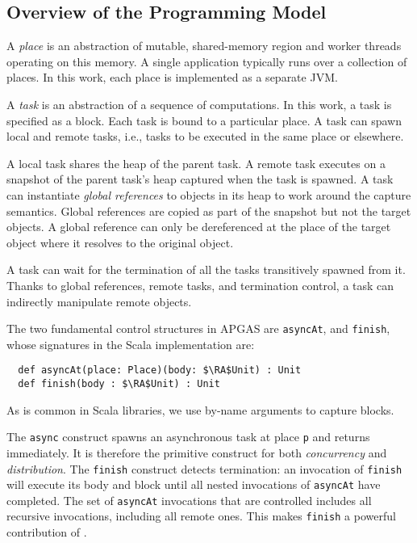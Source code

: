 \subsection{Overview of the \apgas Programming Model}

A {\em place} is an abstraction of mutable, shared-memory region and worker threads operating on this memory.
A single application typically runs over a collection of places. In this work, each place is implemented as a separate JVM.

A {\em task} is an abstraction of a sequence of computations. In this work, a task is specified as a block.
Each task is bound to a particular place. 
A task can spawn local and remote tasks, i.e., tasks to be executed in the same place or elsewhere.

A local task shares the heap of the parent task. A remote task executes on a snapshot of the parent task's heap captured when the task is spawned. A task can instantiate \emph{global references} to objects in its heap to work around the capture semantics.
Global references are copied as part of the snapshot but not the target objects. A global reference can only be dereferenced
at the place of the target object where it resolves to the original object.

A task can wait for the termination of all the tasks transitively spawned from it.
Thanks to global references, remote tasks, and termination control,
a task can indirectly manipulate remote objects.

The two fundamental control structures in APGAS are
 \lstinline{asyncAt}, and \lstinline{finish}, whose signatures in
the Scala implementation are:
\begin{lstlisting}
  def asyncAt(place: Place)(body: $\RA$Unit) : Unit
  def finish(body : $\RA$Unit) : Unit
\end{lstlisting}
As is common in Scala libraries, we use by-name arguments to capture blocks.

The \lstinline{async} construct spawns an asynchronous task at place \lstinline{p} and returns
immediately. It is therefore the primitive construct for both \emph{concurrency} and \emph{distribution}.
The \lstinline{finish} construct detects termination: an invocation of
\lstinline{finish} will execute its body and block until all nested invocations
of \lstinline{asyncAt} have completed. The set of \lstinline{asyncAt} invocations
that are controlled includes all recursive invocations, including all remote
ones. This makes \lstinline{finish} a powerful contribution of \apgas.

